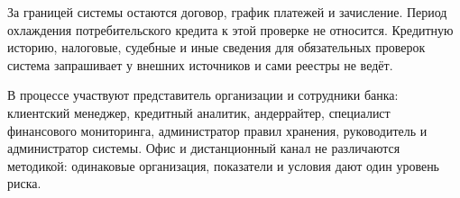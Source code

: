 За границей системы остаются договор, график платежей и зачисление. Период охлаждения потребительского кредита к этой проверке не относится. Кредитную историю, налоговые, судебные и иные сведения для обязательных проверок система запрашивает у внешних источников и сами реестры не ведёт.

В процессе участвуют представитель организации и сотрудники банка: клиентский менеджер, кредитный аналитик, андеррайтер, специалист финансового мониторинга, администратор правил хранения, руководитель и администратор системы. Офис и дистанционный канал не различаются методикой: одинаковые организация, показатели и условия дают один уровень риска.
\fi

